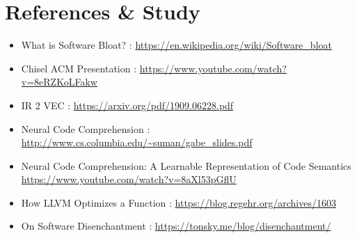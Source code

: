 \documentclass{article} %
\begin{document}
\section*{References \& Study}
\begin{itemize}
    \item What is Software Bloat? : \url{https://en.wikipedia.org/wiki/Software_bloat}
    \item Chisel ACM Presentation : \url{https://www.youtube.com/watch?v=8eRZKoLFakw}
    \item IR 2 VEC : \url{https://arxiv.org/pdf/1909.06228.pdf}
    \item Neural Code Comprehension : \url{http://www.cs.columbia.edu/~suman/gabe_slides.pdf}
    \item Neural Code Comprehension: A Learnable Representation of Code Semantics \url{https://www.youtube.com/watch?v=8aXl53pGflU}
    \item How LLVM Optimizes a Function : \url{https://blog.regehr.org/archives/1603}
    \item On Software Disenchantment : \url{https://tonsky.me/blog/disenchantment/}
\end{itemize}
\end{document}
